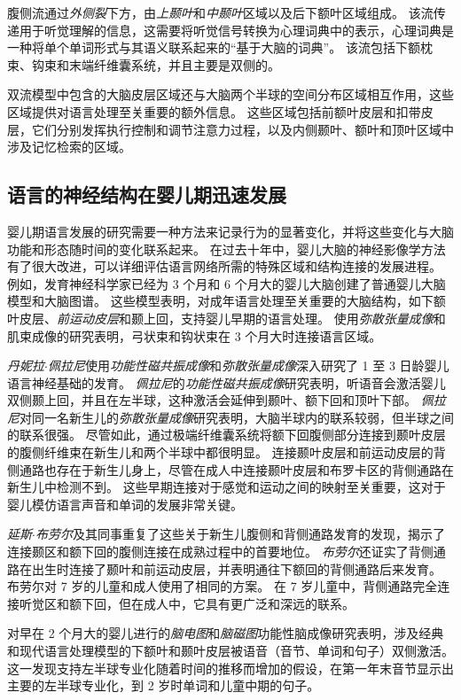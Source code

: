 腹侧流通过\textit{外侧裂}下方，由\textit{上颞叶}和\textit{中颞叶}区域以及后下额叶区域组成。
该流传递用于听觉理解的信息，这需要将听觉信号转换为心理词典中的表示，心理词典是一种将单个单词形式与其语义联系起来的“基于大脑的词典”。
该流包括下额枕束、钩束和末端纤维囊系统，并且主要是双侧的。


双流模型中包含的大脑皮层区域还与大脑两个半球的空间分布区域相互作用，这些区域提供对语言处理至关重要的额外信息。
这些区域包括前额叶皮层和扣带皮层，它们分别发挥执行控制和调节注意力过程，以及内侧颞叶、额叶和顶叶区域中涉及记忆检索的区域。




\subsection{语言的神经结构在婴儿期迅速发展}

婴儿期语言发展的研究需要一种方法来记录行为的显著变化，并将这些变化与大脑功能和形态随时间的变化联系起来。
在过去十年中，婴儿大脑的神经影像学方法有了很大改进，可以详细评估语言网络所需的特殊区域和结构连接的发展进程。
例如，发育神经科学家已经为 3 个月和 6 个月大的婴儿大脑创建了普通婴儿大脑模型和大脑图谱。
这些模型表明，对成年语言处理至关重要的大脑结构，如下额叶皮层、\textit{前运动皮层}和颞上回，支持婴儿早期的语言处理。
使用\textit{弥散张量成像}和肌束成像的研究表明，弓状束和钩状束在 3 个月大时连接语言区域。


\textit{丹妮拉$\cdot$佩拉尼}使用\textit{功能性磁共振成像}和\textit{弥散张量成像}深入研究了 1 至 3 日龄婴儿语言神经基础的发育。
\textit{佩拉尼}的\textit{功能性磁共振成像}研究表明，听语音会激活婴儿双侧颞上回，并且在左半球，这种激活会延伸到颞叶、额下回和顶叶下部。
\textit{佩拉尼}对同一名新生儿的\textit{弥散张量成像}研究表明，大脑半球内的联系较弱，但半球之间的联系很强。
尽管如此，通过极端纤维囊系统将额下回腹侧部分连接到颞叶皮层的腹侧纤维束在新生儿和两个半球中都很明显。
连接颞叶皮层和前运动皮层的背侧通路也存在于新生儿身上，尽管在成人中连接颞叶皮层和布罗卡区的背侧通路在新生儿中检测不到。
这些早期连接对于感觉和运动之间的映射至关重要，这对于婴儿模仿语言声音和单词的发展非常关键。


\textit{延斯$\cdot$布劳尔}及其同事重复了这些关于新生儿腹侧和背侧通路发育的发现，揭示了连接颞区和额下回的腹侧连接在成熟过程中的首要地位。
\textit{布劳尔}还证实了背侧通路在出生时连接了颞叶和前运动皮层，并表明通往下额回的背侧通路后来发育。
布劳尔对 7 岁的儿童和成人使用了相同的方案。
在 7 岁儿童中，背侧通路完全连接听觉区和额下回，但在成人中，它具有更广泛和深远的联系。


对早在 2 个月大的婴儿进行的\textit{脑电图}和\textit{脑磁图}功能性脑成像研究表明，涉及经典和现代语言处理模型的下额叶和颞叶皮层被语音（音节、单词和句子）双侧激活。
这一发现支持左半球专业化随着时间的推移而增加的假设，在第一年末音节显示出主要的左半球专业化，到 2 岁时单词和儿童中期的句子。



